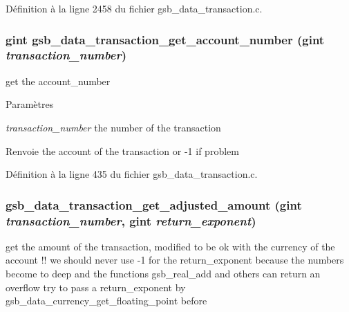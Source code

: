 Définition à la ligne 2458 du fichier gsb\_\-data\_\-transaction.c.

\subsubsection[{gsb\_\-data\_\-transaction\_\-get\_\-account\_\-number}]{\setlength{\rightskip}{0pt plus 5cm}gint gsb\_\-data\_\-transaction\_\-get\_\-account\_\-number (gint {\em transaction\_\-number})}\label{gsb__data__transaction_8h_a5b486efbc486f946e9c998a114054bce}
get the account\_\-number


\begin{DoxyParams}{Paramètres}
\item[{\em transaction\_\-number}]the number of the transaction\end{DoxyParams}
\begin{DoxyReturn}{Renvoie}
the account of the transaction or -\/1 if problem 
\end{DoxyReturn}


Définition à la ligne 435 du fichier gsb\_\-data\_\-transaction.c.

\subsubsection[{gsb\_\-data\_\-transaction\_\-get\_\-adjusted\_\-amount}]{ gsb\_\-data\_\-transaction\_\-get\_\-adjusted\_\-amount (gint {\em transaction\_\-number}, \/  gint {\em return\_\-exponent})}\label{gsb__data__transaction_8h_aa3739bd33106e8dbce2c0938f5f2a882}
get the amount of the transaction, modified to be ok with the currency of the account !! we should never use -\/1 for the return\_\-exponent because the numbers become to deep and the functions gsb\_\-real\_\-add and others can return an overflow try to pass a return\_\-exponent by gsb\_\-data\_\-currency\_\-get\_\-floating\_\-point before


